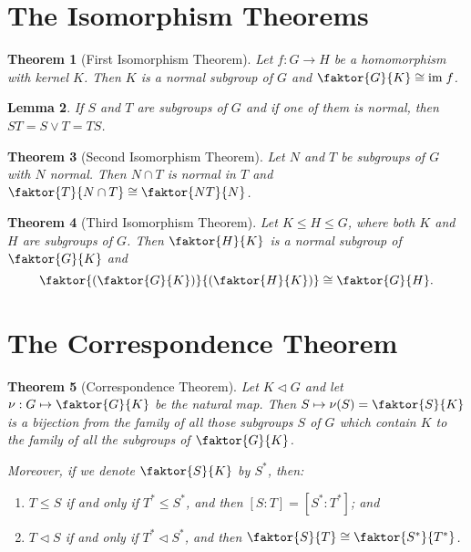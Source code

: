 \documentclass[12pt]{report}
\newtheorem{theorem}{Theorem}[chapter]
\newtheorem{lemma}[theorem]{Lemma}
\theoremstyle{definition}
\begin{document}
\section{The Isomorphism Theorems}

\begin{theorem}[First Isomorphism Theorem]
	Let $f:G\to H$ be a homomorphism with kernel $K$. Then $K$ is a normal subgroup of $G$ and $\faktor{G}{K}\cong \mathrm{im}\;f$.
\end{theorem}

\begin{lemma}
	If $S$ and $T$ are subgroups of $G$ and if one of them is normal, then $ST=S\vee T=TS$.
\end{lemma}

\begin{theorem}[Second Isomorphism Theorem]
	Let $N$ and $T$ be subgroups of $G$ with $N$ normal. Then $N\cap T$ is normal in $T$ and $\faktor{T}{N\cap T}\cong\faktor{NT}{N}$.
\end{theorem}

\begin{theorem}[Third Isomorphism Theorem]
	Let $K\leq H\leq G$, where both $K$ and $H$ are subgroups of $G$. Then $\faktor{H}{K}$ is a normal subgroup of $\faktor{G}{K}$ and
	\[ \faktor{\left(\faktor{G}{K}\right)}{\left(\faktor{H}{K}\right)}\cong\faktor{G}{H}. \]
\end{theorem}



\section{The Correspondence Theorem}

\begin{theorem}[Correspondence Theorem]
	Let $K\vartriangleleft G$ and let $\nu:G\mapsto\faktor{G}{K}$ be the natural map.
	Then $S\mapsto\nu(S)=\faktor{S}{K}$ is a bijection from the family of all those subgroups $S$ of $G$ which contain $K$
	to the family of all the subgroups of $\faktor{G}{K}$.
	\par
	Moreover, if we denote $\faktor{S}{K}$ by $S^\ast$, then:
	\begin{enumerate}
		\item $T\leq S$ if and only if $T^\ast\leq S^\ast$, and then $[S:T]=[S^\ast:T^\ast]$; and
		\item $T\vartriangleleft S$ if and only if $T^\ast\vartriangleleft S^\ast$, and then $\faktor{S}{T}\cong\faktor{S^\ast}{T^\ast}$.
	\end{enumerate}
\end{theorem}
\end{document}
